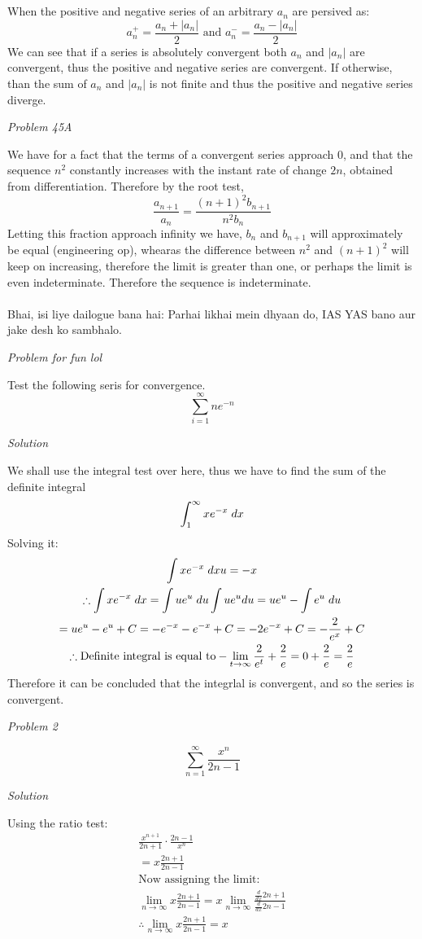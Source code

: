 \documentclass{article}
\newcommand{\qst}[1]{\newpage \begin{center}\textit{Problem #1}\end{center}}
\newcommand{\sol}{\begin{center}\textit{Solution}\end{center}}
\newcommand{\thf}{\\\therefore}
\newcommand{\dx}{\hspace{1mm}dx}
\newcommand{\du}{\hspace{1mm}du}
\begin{document}
\\\\When the positive and negative series of an arbitrary $a_n$ are persived as:
$$a_n^+ = \frac{a_n+|a_n|}{2} \text{ and } a_n^- = \frac{a_n-|a_n|}{2}$$
We can see that if a series is absolutely convergent both $a_n$ and $|a_n|$ are convergent, thus the positive and negative series are convergent. If otherwise, than the sum of $a_n$ and $|a_n|$ is not finite and thus the positive and negative series diverge.
\qst{45A}
We have for a fact that the terms of a convergent series approach 0, and that the sequence $n^2$ constantly increases with the instant rate of change $2n$, obtained from differentiation. Therefore by the root test,
$$\frac{a_{n+1}}{a_n}=\frac{(n+1)^2b_{n+1}}{n^2b_n}$$
Letting this fraction approach infinity we have, $b_n$ and $b_{n+1}$ will approximately be equal (engineering op), whearas the difference between $n^2$ and $(n+1)^2$ will keep on increasing, therefore the limit is greater than one, or perhaps the limit is even indeterminate. Therefore the sequence is indeterminate.
\\\\Bhai, isi liye dailogue bana hai: Parhai likhai mein dhyaan do, IAS YAS bano aur jake desh ko sambhalo.
\qst{for fun lol}
Test the following seris for convergence.
$$\sum^{\infty}_{i=1} ne^{-n}$$
\sol
We shall use the integral test over here, thus we have to find the sum of the definite integral
$$\int^{\infty}_{1} xe^{-x}\dx$$
Solving it:
\begin{gather*}
\int xe^{-x}\dx
u=-x
\\\therefore \int xe^{-x}\dx = \int ue^u \du
\int ue^u du=ue^u-\int e^u \du
\\=ue^u-e^u+C = -e^{-x}-e^{-x}+C=-2e^{-x}+C=-\frac{2}{e^x}+C
\thf \text{Definite integral is equal to}
-\lim_{t\to\infty}\frac{2}{e^t}+\frac{2}{e}=0+\frac{2}{e}=\frac{2}{e}
\end{gather*}
Therefore it can be concluded that the integrlal is convergent, and so the series is convergent.
\qst{2}
$$\sum_{n=1}^{\infty} \frac{x^n}{2n-1}$$
\sol
Using the ratio test:
\begin{gather*}
\frac{x^{n+1}}{2n+1}\cdot \frac{2n-1}{x^n}
\\=x\frac{2n+1}{2n-1}
\\\text{Now assigning the limit:}
\\\lim_{n\to\infty}x\frac{2n+1}{2n-1}=x\lim_{n\to\infty} \frac{\frac{d}{dx}2n+1}{\frac{d}{dx}2n-1}
\thf \lim_{n\to\infty}x\frac{2n+1}{2n-1}=x
\end{gather*}
\end{document}
